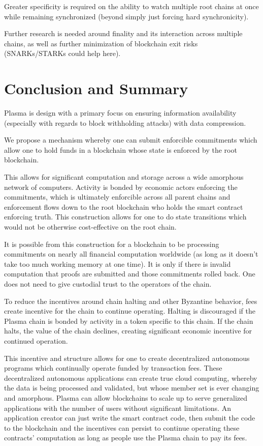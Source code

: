 \documentclass[letterpaper, 11pt]{article}
\begin{document}
Greater specificity is required on the ability to watch multiple root chains at
once while remaining synchronized (beyond simply just forcing hard
synchronicity).

Further research is needed around finality and its interaction across multiple
chains, as well as further minimization of blockchain exit risks (SNARKs/STARKs
could help here).

\section{Conclusion and Summary}

Plasma is design with a primary focus on ensuring information availability
(especially with regards to block withholding attacks) with data compression.

We propose a mechanism whereby one can submit enforcible commitments which allow
one to hold funds in a blockchain whose state is enforced by the root
blockchain.

This allows for significant computation and storage across a wide amorphous
network of computers. Activity is bonded by economic actors enforcing the
commitments, which is ultimately enforcible across all parent chains and
enforcement flows down to the root blockchain who holds the smart contract
enforcing truth. This construction allows for one to do state transitions which
would not be otherwise cost-effective on the root chain.

It is possible from this construction for a blockchain to be processing
commitments on nearly all financial computation worldwide (as long as it doesn't
take too much working memory at one time). It is only if there is invalid
computation that proofs are submitted and those commitments rolled back. One
does not need to give custodial trust to the operators of the chain.

To reduce the incentives around chain halting and other Byzantine behavior, fees
create incentive for the chain to continue operating. Halting is discouraged if
the Plasma chain is bonded by activity in a token specific to this chain. If the
chain halts, the value of the chain declines, creating significant economic
incentive for continued operation.

This incentive and structure allows for one to create decentralized autonomous
programs which continually operate funded by transaction fees. These
decentralized autonomous applications can create true cloud computing, whereby
the data is being processed and validated, but whose member set is ever
changing and amorphous. Plasma can allow blockchains to scale up to serve
generalized applications with the number of users without significant
limitations. An application creator can just write the smart contract code,
then submit the code to the blockchain and the incentives can persist to
continue operating these contracts' computation as long as people use the
Plasma chain to pay its fees. 
\end{document}
